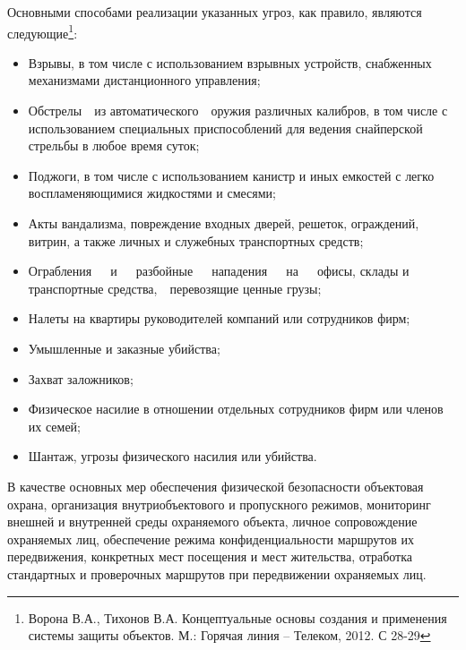 \documentclass[a4paper,12pt,fleqn]{article} %
\begin{document}
Основными способами реализации указанных угроз, как правило,  являются следующие\footnote{Ворона В.А., Тихонов В.А. Концептуальные основы создания и применения системы защиты объектов. М.: Горячая линия – Телеком, 2012. С 28-29}:
 
\begin{itemize}
	\item Взрывы, в том числе с использованием взрывных ус­тройств, снабженных механизмами дистанционного уп­равления; 
	\item Обстрелы  из автоматического  оружия различных калибров, в том числе с использованием специальных при­способлений для ведения снайперской стрельбы в любое время суток; 
	\item Поджоги, в том числе с использованием канистр и иных емкостей с легко воспламеняющимися жидкостями и смесями; 
	\item Акты вандализма, повреждение входных дверей, ре­шеток, ограждений, витрин, а также личных и служебных транспортных средств; 
	\item Ограбления   и   разбойные   нападения   на   офисы, склады и транспортные средства,  перевозящие ценные грузы; 
	\item Налеты на квартиры руководителей компаний или сотрудников фирм; 
	\item Умышленные и заказные убийства; 
	\item Захват заложников; 
	\item Физическое насилие в отношении отдельных со­трудников фирм или членов их семей;
	\item Шантаж, угрозы физического насилия или убий­ства. 
\end{itemize}

В качестве основных мер обеспечения физической безопасности объектовая охрана, организация внутриобъектового и пропускного режимов, мониторинг внешней и внутренней среды охраняемого объекта, личное сопровождение охраняемых лиц, обеспечение режима конфиденциальности маршрутов их передвижения, конкретных мест посещения и мест жительства, отработка стандартных и проверочных маршрутов при передвижении охраняемых лиц.\\
\end{document}

